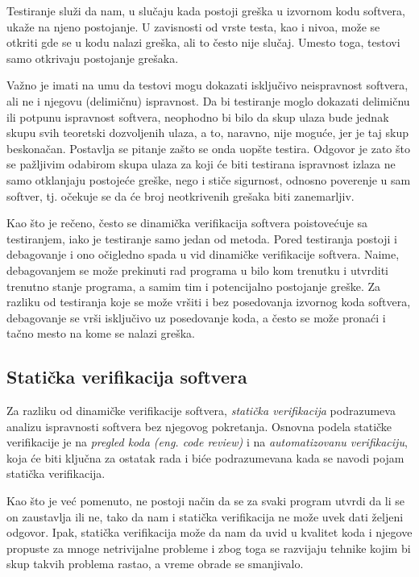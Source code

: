 \documentclass[a4paper]{article}
\theoremstyle{definition}
\begin{document}
{\par Testiranje služi da nam, u slučaju kada postoji greška u izvornom kodu softvera, ukaže na njeno postojanje. U zavisnosti od vrste testa, kao i nivoa, može se otkriti gde se u kodu nalazi greška, ali to često nije slučaj. Umesto toga, testovi samo otkrivaju postojanje grešaka.

\par Važno je imati na umu da testovi mogu dokazati isključivo neispravnost softvera, ali ne i njegovu (delimičnu) ispravnost. Da bi testiranje moglo dokazati delimičnu ili potpunu ispravnost softvera, neophodno bi bilo da skup ulaza bude jednak skupu svih teoretski dozvoljenih ulaza, a to, naravno, nije moguće, jer je taj skup beskonačan. Postavlja se pitanje zašto se onda uopšte testira. Odgovor je zato što se pažljivim odabirom skupa ulaza za koji će biti testirana ispravnost izlaza ne samo otklanjaju postojeće greške, nego i stiče sigurnost, odnosno poverenje u sam softver, tj. očekuje se da će broj neotkrivenih grešaka biti zanemarljiv.

\par Kao što je rečeno, često se dinamička verifikacija softvera poistovećuje sa testiranjem, iako je testiranje samo jedan od metoda. Pored testiranja postoji i debagovanje i ono očigledno spada u vid dinamičke verifikacije softvera. Naime, debagovanjem se može prekinuti rad programa u bilo kom trenutku i utvrditi trenutno stanje programa, a samim tim i potencijalno postojanje greške. Za razliku od testiranja koje se može vršiti i bez posedovanja izvornog koda softvera, debagovanje se vrši isključivo uz posedovanje koda, a često se može pronaći i tačno mesto na kome se nalazi greška.

\subsection{Statička verifikacija softvera}
\label{subsec:staticka}

\par Za razliku od dinamičke verifikacije softvera, \textit{statička verifikacija} podrazumeva analizu ispravnosti softvera bez njegovog pokretanja. Osnovna podela statičke verifikacije je na \textit{pregled koda (eng. code review)} i na \textit{automatizovanu verifikaciju}, koja će biti ključna za ostatak rada i biće podrazumevana kada se navodi pojam statička verifikacija.

\par Kao što je već pomenuto, ne postoji način da se za svaki program utvrdi da li se on zaustavlja ili ne, tako da nam i statička verifikacija ne može uvek dati željeni odgovor. Ipak, statička verifikacija može da nam da uvid u kvalitet koda i njegove propuste za mnoge netrivijalne probleme i zbog toga se razvijaju tehnike kojim bi skup takvih problema rastao, a vreme obrade se smanjivalo. 
\\\\

}
\end{document}
